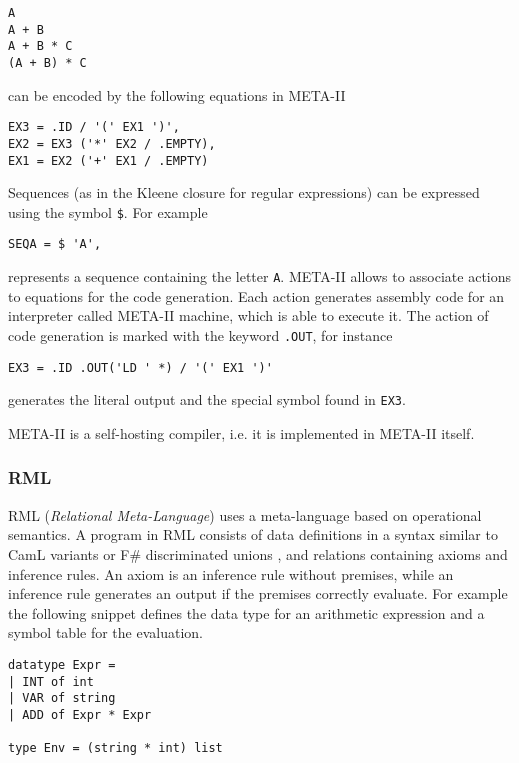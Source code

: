 \begin{lstlisting}
A
A + B
A + B * C
(A + B) * C
\end{lstlisting}

\noindent
can be encoded by the following equations in META-II

\begin{lstlisting}
EX3 = .ID / '(' EX1 ')',
EX2 = EX3 ('*' EX2 / .EMPTY),
EX1 = EX2 ('+' EX1 / .EMPTY)
\end{lstlisting}

\noindent
Sequences (as in the Kleene closure for regular expressions) can be expressed using the symbol \texttt{\$}. For example

\begin{lstlisting}
SEQA = $ 'A',
\end{lstlisting}

\noindent
represents a sequence containing the letter \texttt{A}.
META-II allows to associate actions to equations for the code generation. Each action generates assembly code for an interpreter called META-II machine, which is able to execute it. The action of code generation is marked with the keyword \texttt{.OUT}, for instance

\begin{lstlisting}
EX3 = .ID .OUT('LD ' *) / '(' EX1 ')'
\end{lstlisting}

\noindent
generates the literal output and the special symbol found in \texttt{EX3}.

META-II is a self-hosting compiler, i.e. it is implemented in META-II itself.

\subsubsection{RML}
RML \cite{pettersson1996compiler} (\textit{Relational Meta-Language}) uses a meta-language based on operational semantics. A program in RML consists of data definitions in a syntax similar to CamL variants \cite{minsky2013real} or F\# discriminated unions \cite{fsharunions}, and relations containing axioms and inference rules. An axiom is an inference rule without premises, while an inference rule generates an output if the premises correctly evaluate. For example the following snippet defines the data type for an arithmetic expression and a symbol table for the evaluation.

\begin{lstlisting}
datatype Expr =
| INT of int
| VAR of string
| ADD of Expr * Expr

type Env = (string * int) list
\end{lstlisting}

